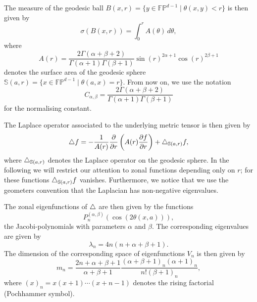 The measure of the geodesic ball
$B(x,r)=\{y\in\mathbb{FP}^{d-1}\mid\theta(x,y)<r\}$ is then given by
\begin{equation*}
  \sigma(B(x,r))=\int_0^r A(\theta)\,d\theta,
\end{equation*}
where
\begin{equation*}
  A(r)=\frac{2\Gamma(\alpha+\beta+2)}{\Gamma(\alpha+1)\Gamma(\beta+1)}
  \sin(r)^{2\alpha+1}\cos(r)^{2\beta+1}
\end{equation*}
denotes the surface area of the geodesic sphere
$\mathbb{S}(a,r)=\{x\in\mathbb{FP}^{d-1}\mid \theta(a,x)=r\}$. From now on, we
use the notation
\begin{equation*}
  C_{\alpha,\beta}=
  \frac{2\Gamma(\alpha+\beta+2)}{\Gamma(\alpha+1)\Gamma(\beta+1)}
\end{equation*}
for the normalising constant.

The Laplace operator associated to the underlying metric tensor is then given
by
\begin{equation*}
  \triangle f=-\frac1{A(r)}\frac\partial{\partial r}
  \left(A(r)\frac{\partial f}{\partial r}\right)+\triangle_{\mathbb{S}(a,r)}f,
\end{equation*}
where $\triangle_{\mathbb{S}(a,r)}$ denotes the Laplace operator on the geodesic
sphere. In the following we will restrict our attention to zonal functions
depending only on $r$; for these functions $\triangle_{\mathbb{S}(a,r)}f$
vanishes. Furthermore, we notice that we use the geometers convention that the
Laplacian has non-negative eigenvalues.

The zonal eigenfunctions of $\triangle$ are then given by the functions
\begin{equation*}
  P_n^{(\alpha,\beta)}(\cos(2\theta(x,a))),
\end{equation*}
the Jacobi-polynomials with parameters $\alpha$ and $\beta$. The corresponding
eigenvalues are given by
\begin{equation*}
  \lambda_n=4n(n+\alpha+\beta+1).
\end{equation*}
The dimension of the corresponding space of eigenfunctions $V_n$ is then given
by
\begin{equation*}
  m_n=\frac{2n+\alpha+\beta+1}{\alpha+\beta+1}
  \frac{(\alpha+\beta+1)_n(\alpha+1)_n}{n!(\beta+1)_n},
\end{equation*}
where $(x)_n=x(x+1)\cdots(x+n-1)$ denotes the rising factorial (Pochhammer
symbol).

